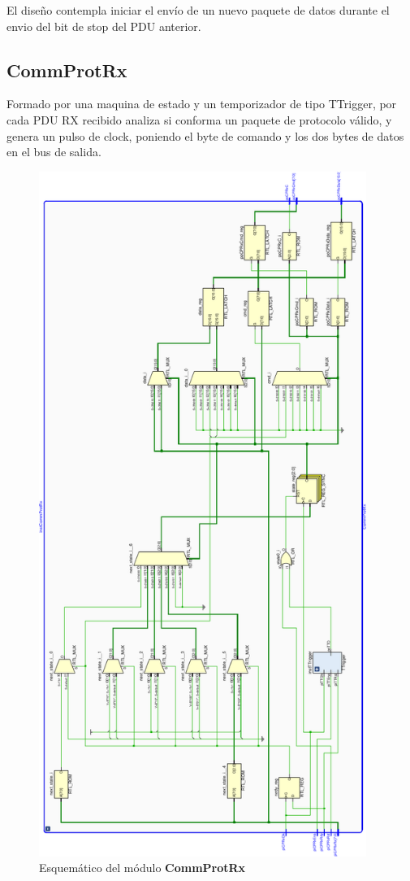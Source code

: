 \documentclass[12pt]{article}
\begin{document}
El diseño contempla iniciar el envío de un nuevo paquete de datos durante el envio del bit de stop del PDU anterior.

\subsection{CommProtRx}
Formado por una maquina de estado y un temporizador de tipo TTrigger, por cada PDU RX recibido analiza si conforma un paquete de protocolo válido, y genera un pulso de clock, poniendo el byte de comando y los dos bytes de datos en el bus de salida.

\begin{figure}[H]
    \centering
    \includegraphics[angle=270, width=0.95\textwidth]{CommProtRx-crop}
    \caption{Esquemático del módulo \textbf{CommProtRx}}
\end{figure}
\end{document}

